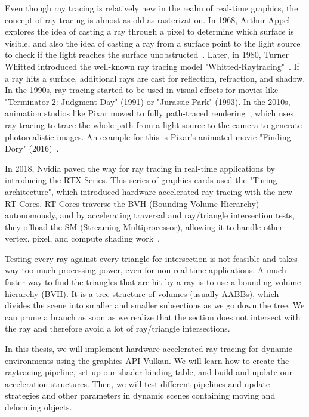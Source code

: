 Even though ray tracing is relatively new in the realm of real-time graphics, the concept of ray tracing is almost as old as rasterization. In 1968, Arthur Appel explores the idea of casting a ray through a pixel to determine which surface is visible, and also the idea of casting a ray from a surface point to the light source to check if the light reaches the surface unobstructed~\parencite{appel-1968}. Later, in 1980, Turner Whitted introduced the well-known ray tracing model "Whitted-Raytracing"~\parencite{whitted-1980}. If a ray hits a surface, additional rays are cast for reflection, refraction, and shadow. In the 1990s, ray tracing started to be used in visual effects for movies like "Terminator 2: Judgment Day" (1991) or "Jurassic Park" (1993). In the 2010s, animation studios like Pixar moved to fully path-traced rendering~\parencite{renderman}, which uses ray tracing to trace the whole path from a light source to the camera to generate photorealistic images. An example for this is Pixar's animated movie "Finding Dory" (2016)~\parencite{finding-dory}.

In 2018, Nvidia paved the way for ray tracing in real-time applications by introducing the RTX Series. This series of graphics cards used the "Turing architecture", which introduced hardware-accelerated ray tracing with the new RT Cores. RT Cores traverse the BVH (Bounding Volume Hierarchy) autonomously, and by accelerating traversal and ray/triangle intersection tests, they offload the SM (Streaming Multiprocessor), allowing it to handle other vertex, pixel, and compute shading work~\parencite{turing-arch}.

Testing every ray against every triangle for intersection is not feasible and takes way too much processing power, even for non-real-time applications. A much faster way to find the triangles that are hit by a ray is to use a bounding volume hierarchy (BVH). It is a tree structure of volumes (usually AABBs), which divides the scene into smaller and smaller subsections as we go down the tree. We can prune a branch as soon as we realize that the section does not intersect with the ray and therefore avoid a lot of ray/triangle intersections.

In this thesis, we will implement hardware-accelerated ray tracing for dynamic environments using the graphics API Vulkan. We will learn how to create the raytracing pipeline, set up our shader binding table, and build and update our acceleration structures. Then, we will test different pipelines and update strategies and other parameters in dynamic scenes containing moving and deforming objects.